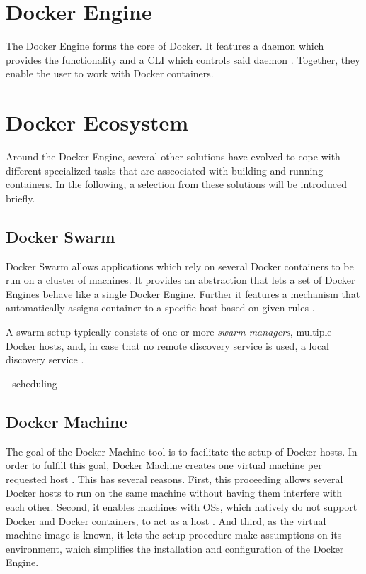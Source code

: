 

\section{Docker Engine} %
\label{sec:docker_engine}

 The Docker Engine forms the core of Docker. It features a daemon which provides the functionality and a \ac{CLI} which controls said daemon \cite{Docker????DockerCom}. Together, they enable the user to work with Docker containers.


\section{Docker Ecosystem} %
\label{sec:docker_ecosystem}

  Around the Docker Engine, several other solutions have evolved to cope with different specialized tasks that are asscociated with building and running containers. In the following, a selection from these solutions will be introduced briefly.

  \subsection{Docker Swarm} %
  \label{sub:docker_swarm}
    Docker Swarm allows applications which rely on several Docker containers to be run on a cluster of machines. It provides an abstraction that lets a set of Docker Engines behave like a single Docker Engine. Further it features a mechanism that automatically assigns container to a specific host based on given rules \cite{Docker????Dockerb}.

    A swarm setup typically consists of one or more \emph{swarm managers}, multiple Docker hosts, and, in case that no remote discovery service is used, a local discovery service \cite{Docker????Dockera}.

    - scheduling


  \subsection{Docker Machine} %
  \label{sub:docker_machine}
    The goal of the Docker Machine tool is to facilitate the setup of Docker hosts. In order to fulfill this goal, Docker Machine creates one virtual machine per requested host \cite{Docker????Dockerb,Docker????Dockera}. This has several reasons. First, this proceeding allows several Docker hosts to run on the same machine without having them interfere with each other. Second, it enables machines with \ac{OS}s, which natively do not support Docker and Docker containers, to act as a host \cite{Docker????Dockera}. And third, as the virtual machine image is known, it lets the setup procedure make assumptions on its environment, which simplifies the installation and configuration of the Docker Engine.


